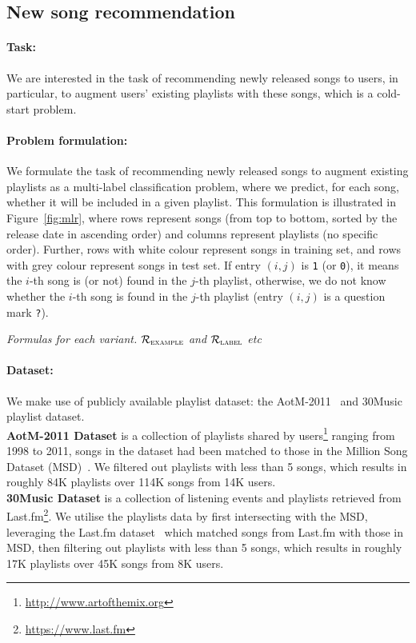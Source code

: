\subsection{New song recommendation}
\label{ssec:newsongrec}

\paragraph{Task:} 
We are interested in the task of recommending newly released songs to users,
in particular, to augment users' existing playlists with these songs,
which is a cold-start problem.

\paragraph{Problem formulation:}
We formulate the task of recommending newly released songs to augment existing playlists
as a multi-label classification problem, where we predict, for each song, 
whether it will be included in a given playlist.
This formulation is illustrated in Figure~\ref{fig:mlr},
where rows represent songs (from top to bottom, sorted by the release date in ascending order)
and columns represent playlists (no specific order).
Further, rows with white colour represent songs in training set, and rows with grey colour represent songs in test set.
If entry $(i, j)$ is \texttt{1} (or \texttt{0}), it means the $i$-th song is (or not) found in the $j$-th playlist,
otherwise, we do not know whether the $i$-th song is found in the $j$-th playlist (\ie entry $(i, j)$ is a question mark \texttt{?}).


\TODO
{\it Formulas for each variant. $\mathcal{R}_\textsc{example}$ and $\mathcal{R}_\textsc{label}$ etc}




\paragraph{Dataset:}
We make use of publicly available playlist dataset: the AotM-2011~\cite{mcfee2012hypergraph} and 30Music~\cite{30music2015} playlist dataset. \\
%
{\bf AotM-2011 Dataset} is a collection of playlists shared by users\footnote{\url{http://www.artofthemix.org}} ranging from 1998 to 2011, 
songs in the dataset had been matched to those in the Million Song Dataset (MSD)~\cite{msd2011}.
We filtered out playlists with less than 5 songs, which results in roughly 84K playlists over 114K songs from 14K users. \\
%
{\bf 30Music Dataset} is a collection of listening events and playlists retrieved from Last.fm\footnote{\url{https://www.last.fm}}.
We utilise the playlists data by first intersecting with the MSD, leveraging the Last.fm dataset~\cite{lastfmdataset} 
which matched songs from Last.fm with those in MSD, then filtering out playlists with less than 5 songs, 
which results in roughly 17K playlists over 45K songs from 8K users.

